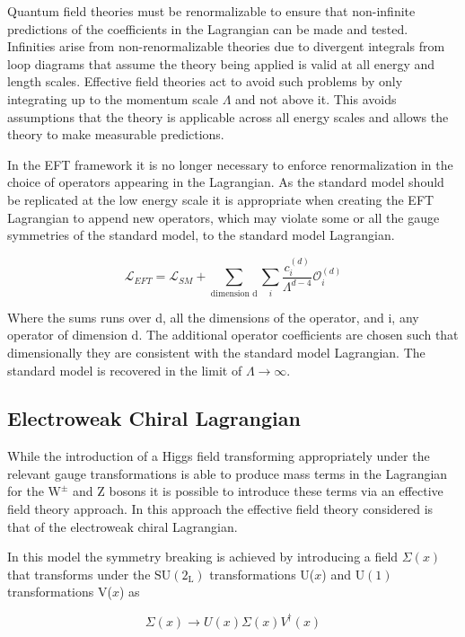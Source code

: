 Quantum field theories must be renormalizable to ensure that non-infinite predictions of the coefficients in the Lagrangian can be made and tested.  Infinities arise from non-renormalizable theories due to divergent integrals from loop diagrams that assume the theory being applied is valid at all energy and length scales.  Effective field theories act to avoid such problems by only integrating up to the momentum scale $\Lambda$ and not above it.  This avoids assumptions that the theory is applicable across all energy scales and allows the theory to make measurable predictions.  

In the EFT framework it is no longer necessary to enforce renormalization in the choice of operators appearing in the Lagrangian.  As the standard model should be replicated at the low energy scale it is appropriate when creating the EFT Lagrangian to append new operators, which may violate some or all the gauge symmetries of the standard model, to the standard model Lagrangian.

\begin{equation}
\mathcal{L}_{EFT} = \mathcal{L}_{SM} + \sum_{\text{dimension d}} \sum_{i} \frac{c_{i}^{(d)}}{\Lambda^{d-4}} \mathcal{O}_{i}^{(d)}
\end{equation}

Where the sums runs over d, all the dimensions of the operator, and i, any operator of dimension d.  The additional operator coefficients are chosen such that dimensionally they are consistent with the standard model Lagrangian.  The standard model is recovered in the limit of $\Lambda \rightarrow \infty$.

\subsection{Electroweak Chiral Lagrangian}
While the introduction of a Higgs field transforming appropriately under the relevant gauge transformations is able to produce mass terms in the Lagrangian for the $\text{W}^{\pm}$ and Z bosons it is possible to introduce these terms via an effective field theory approach.  In this approach the effective field theory considered is that of the electroweak chiral Lagrangian.  

In this model the symmetry breaking is achieved by introducing a field $\Sigma(x)$ that transforms under the $\text{SU}(2_{\text{L}})$ transformations U($x$) and $\text{U}(1)$ transformations V($x$) as

\begin{equation}
\Sigma(x) \rightarrow U(x) \Sigma(x) V^{\dagger}(x)
\end{equation}

